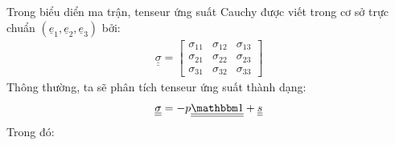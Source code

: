 \documentclass[../../../main.tex]{subfiles}
\begin{document}
	Trong biểu diển ma trận, tenseur ứng suất Cauchy được viết trong cơ sở trực chuẩn $\left(\underline{e}_1,\underline{e}_2,\underline{e}_3\right)$ bởi:
		\begin{align}
			\underline{\underline{\sigma}}=\left[
				\begin{array}{ccc}
					\sigma_{11} & \sigma_{12} & \sigma_{13}\\
					\sigma_{21} & \sigma_{22} & \sigma_{23}\\
					\sigma_{31} & \sigma_{32} & \sigma_{33}
				\end{array}\right]
		\end{align}
	Thông thường, ta sẽ phân tích tenseur ứng suất thành dạng:
		\begin{align}
			\underline{\underline{\sigma}}=-p\underline{\underline{\mathbbm
			1}}+\underline{\underline{s}}
		\end{align}
	Trong đó:
\end{document}
